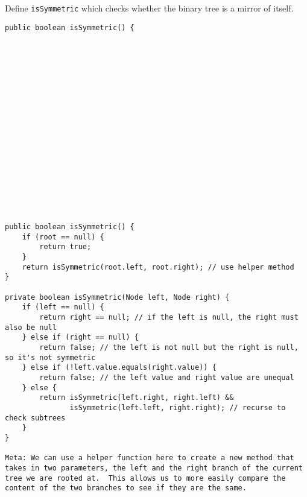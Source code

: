 \question Define \texttt{isSymmetric} which checks whether the binary tree is a mirror of itself.

\ifprintanswers\else
\begin{lstlisting}
public boolean isSymmetric() {



















\end{lstlisting}
\fi

\begin{solution}
\begin{lstlisting}
public boolean isSymmetric() {
    if (root == null) {
        return true;
    }
    return isSymmetric(root.left, root.right); // use helper method
}

private boolean isSymmetric(Node left, Node right) {
    if (left == null) {
        return right == null; // if the left is null, the right must also be null
    } else if (right == null) {
        return false; // the left is not null but the right is null, so it's not symmetric
    } else if (!left.value.equals(right.value)) {
        return false; // the left value and right value are unequal
    } else {
        return isSymmetric(left.right, right.left) && 
               isSymmetric(left.left, right.right); // recurse to check subtrees
    }
}

Meta: We can use a helper function here to create a new method that takes in two parameters, the left and the right branch of the current tree we are rooted at.  This allows us to more easily compare the content of the two branches to see if they are the same.
\end{lstlisting}
\end{solution}